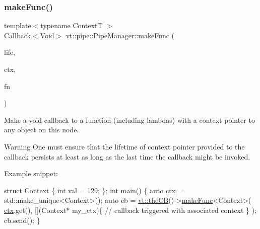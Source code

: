 \subsubsection{\texorpdfstring{make\+Func()}{makeFunc()}\hspace{0.1cm}{\footnotesize\ttfamily [4/6]}}
{\footnotesize\ttfamily template$<$typename ContextT $>$ \\
\hyperlink{namespacevt_a36db99df4c973d48b1118a293fff533f}{Callback}$<$\hyperlink{structvt_1_1pipe_1_1_pipe_manager_ab720c2580ecfd3ab36e49aeaaff64cc6}{Void}$>$ vt\+::pipe\+::\+Pipe\+Manager\+::make\+Func (\begin{DoxyParamCaption}\item[{\hyperlink{namespacevt_1_1pipe_acb42b284378c0fdac1d7c6335dc26f58}{Lifetime\+Enum}}]{life,  }\item[{ContextT $\ast$}]{ctx,  }\item[{\hyperlink{structvt_1_1pipe_1_1_pipe_manager_base_ad8463823b6b4cfdb67c119d6d22e3bac}{Func\+Ctx\+Type}$<$ ContextT $>$}]{fn }\end{DoxyParamCaption})}



Make a void callback to a function (including lambdas) with a context pointer to any object on this node. 

\begin{DoxyWarning}{Warning}
One must ensure that the lifetime of context pointer provided to the callback persists at least as long as the last time the callback might be invoked.
\end{DoxyWarning}
Example snippet\+:


\begin{DoxyCode}
\textcolor{keyword}{struct }Context \{ \textcolor{keywordtype}{int} val = 129; \};
\textcolor{keywordtype}{int} main() \{
  \textcolor{keyword}{auto} \hyperlink{namespacevt_1_1config_a0551245b6b893932b95aaf8eac94eed1}{ctx} = std::make\_unique<Context>();
  \textcolor{keyword}{auto} cb = \hyperlink{namespacevt_a673b109e94c7bca58313504c83e1da94}{vt::theCB}()->\hyperlink{structvt_1_1pipe_1_1_pipe_manager_a9ceec59c887d0fa1498b931c788962f6}{makeFunc}<Context>(
    \hyperlink{namespacevt_1_1config_a0551245b6b893932b95aaf8eac94eed1}{ctx}.get(), [](Context* my\_ctx)\{
      \textcolor{comment}{// callback triggered with associated context}
    \}
  );
  cb.send();
\}
\end{DoxyCode}



